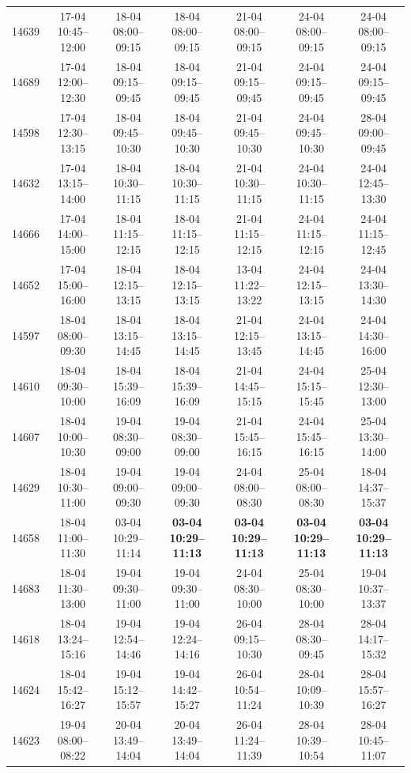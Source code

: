 \begin{table}[htbp]
\begin{tabular}{|r|c|c|c|c|c|c|}
14639 & 17-04 10:45--12:00 & 18-04 08:00--09:15 & 18-04 08:00--09:15 & 21-04 08:00--09:15 & 24-04 08:00--09:15 & 24-04 08:00--09:15 \\ 
14689 & 17-04 12:00--12:30 & 18-04 09:15--09:45 & 18-04 09:15--09:45 & 21-04 09:15--09:45 & 24-04 09:15--09:45 & 24-04 09:15--09:45 \\ 
14598 & 17-04 12:30--13:15 & 18-04 09:45--10:30 & 18-04 09:45--10:30 & 21-04 09:45--10:30 & 24-04 09:45--10:30 & 28-04 09:00--09:45 \\ 
14632 & 17-04 13:15--14:00 & 18-04 10:30--11:15 & 18-04 10:30--11:15 & 21-04 10:30--11:15 & 24-04 10:30--11:15 & 24-04 12:45--13:30 \\ 
14666 & 17-04 14:00--15:00 & 18-04 11:15--12:15 & 18-04 11:15--12:15 & 21-04 11:15--12:15 & 24-04 11:15--12:15 & 24-04 11:15--12:45 \\ 
14652 & 17-04 15:00--16:00 & 18-04 12:15--13:15 & 18-04 12:15--13:15 & 13-04 11:22--13:22 & 24-04 12:15--13:15 & 24-04 13:30--14:30 \\ 
14597 & 18-04 08:00--09:30 & 18-04 13:15--14:45 & 18-04 13:15--14:45 & 21-04 12:15--13:45 & 24-04 13:15--14:45 & 24-04 14:30--16:00 \\ 
14610 & 18-04 09:30--10:00 & 18-04 15:39--16:09 & 18-04 15:39--16:09 & 21-04 14:45--15:15 & 24-04 15:15--15:45 & 25-04 12:30--13:00 \\ 
14607 & 18-04 10:00--10:30 & 19-04 08:30--09:00 & 19-04 08:30--09:00 & 21-04 15:45--16:15 & 24-04 15:45--16:15 & 25-04 13:30--14:00 \\ 
14629 & 18-04 10:30--11:00 & 19-04 09:00--09:30 & 19-04 09:00--09:30 & 24-04 08:00--08:30 & 25-04 08:00--08:30 & 18-04 14:37--15:37 \\ 
14658 & 18-04 11:00--11:30 & 03-04 10:29--11:14 & \textbf{03-04 10:29--11:13} & \textbf{03-04 10:29--11:13} & \textbf{03-04 10:29--11:13} & \textbf{03-04 10:29--11:13} \\ 
14683 & 18-04 11:30--13:00 & 19-04 09:30--11:00 & 19-04 09:30--11:00 & 24-04 08:30--10:00 & 25-04 08:30--10:00 & 19-04 10:37--13:37 \\ 
14618 & 18-04 13:24--15:16 & 19-04 12:54--14:46 & 19-04 12:24--14:16 & 26-04 09:15--10:30 & 28-04 08:30--09:45 & 28-04 14:17--15:32 \\ 
14624 & 18-04 15:42--16:27 & 19-04 15:12--15:57 & 19-04 14:42--15:27 & 26-04 10:54--11:24 & 28-04 10:09--10:39 & 28-04 15:57--16:27 \\ 
14623 & 19-04 08:00--08:22 & 20-04 13:49--14:04 & 20-04 13:49--14:04 & 26-04 11:24--11:39 & 28-04 10:39--10:54 & 28-04 10:45--11:07 \\ 

\end{tabular}
\end{table}

